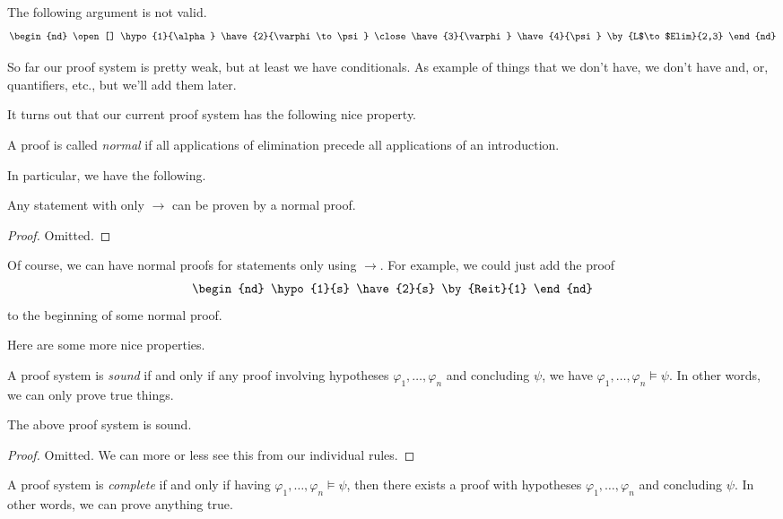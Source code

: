 \begin{nex}
	The following argument is not valid.
	\begin{align*}
		\begin{nd}
			\open[]
				\hypo{1}{\alpha}
				\have{2}{\varphi\to\psi}
			\close
			\have{3}{\varphi}
			\have{4}{\psi} \by{L$\to$Elim}{2,3}
		\end{nd}
	\end{align*}
\end{nex}
So far our proof system is pretty weak, but at least we have conditionals. As example of things that we don't have, we don't have and, or, quantifiers, etc., but we'll add them later.

It turns out that our current proof system has the following nice property.
\begin{definition}[Normal]
	A proof is called \textit{normal} if all applications of elimination precede all applications of an introduction.
\end{definition}
In particular, we have the following.
\begin{proposition}
	Any statement with only $\to$ can be proven by a normal proof.
\end{proposition}
\begin{proof}
	Omitted.
\end{proof}
\begin{remark}
	Of course, we can have normal proofs for statements only using $\to$. For example, we could just add the proof
	\begin{align*}
		\begin{nd}
			\hypo{1}{s}
			\have{2}{s} \by{Reit}{1}
		\end{nd}
	\end{align*}
	to the beginning of some normal proof.
\end{remark}
Here are some more nice properties.
\begin{definition}[Sound]
	A proof system is \textit{sound} if and only if any proof involving hypotheses $\varphi_1,\ldots,\varphi_n$ and concluding $\psi$, we have $\varphi_1,\ldots,\varphi_n\models\psi$. In other words, we can only prove true things.
\end{definition}
\begin{proposition}
	The above proof system is sound.
\end{proposition}
\begin{proof}
	Omitted. We can more or less see this from our individual rules.
\end{proof}
\begin{definition}[Complete]
	A proof system is \textit{complete} if and only if having $\varphi_1,\ldots,\varphi_n\models\psi$, then there exists a proof with hypotheses $\varphi_1,\ldots,\varphi_n$ and concluding $\psi$. In other words, we can prove anything true.
\end{definition}
